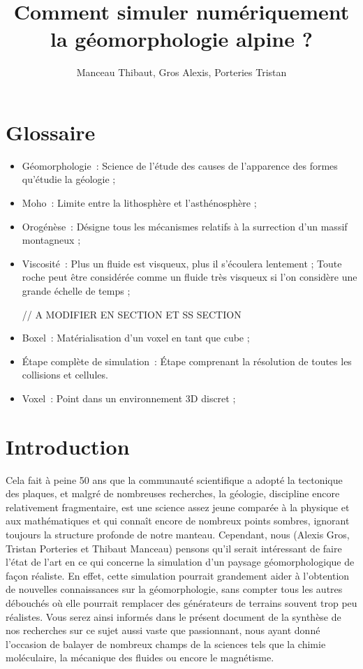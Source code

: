 \documentclass[a4paper,11pt]{article}
\title{Comment simuler numériquement la géomorphologie alpine ?}
\author{Manceau Thibaut, Gros Alexis, Porteries Tristan}
\begin{document}
\maketitle

\clearpage

\tableofcontents

\clearpage

\section{Glossaire}

\begin{itemize}

  \item Géomorphologie~: Science de l'étude des causes de l'apparence des formes qu'étudie la géologie ;
  \item Moho~: Limite entre la lithosphère et l'asthénosphère ;
  \item Orogénèse~: Désigne tous les mécanismes relatifs à la surrection d'un massif montagneux ;
  \item Viscosité~: Plus un fluide est visqueux, plus il s'écoulera lentement ;
  Toute roche peut être considérée comme un fluide très visqueux si l'on considère une grande échelle de temps ;
  
  // A MODIFIER EN SECTION ET SS SECTION
  \item Boxel~: Matérialisation d'un voxel en tant que cube ;
  \item Étape complète de simulation~: Étape comprenant la résolution de toutes les collisions et cellules.
  \item Voxel~: Point dans un environnement 3D discret ;
\end{itemize}

\section{Introduction}

Cela fait à peine 50 ans que la communauté scientifique a adopté la tectonique des plaques, et malgré de nombreuses recherches, la géologie, discipline encore relativement fragmentaire, est une science assez jeune comparée à la physique et aux mathématiques et qui connaît encore de nombreux points sombres, ignorant toujours la structure profonde de notre manteau.
Cependant, nous (Alexis Gros, Tristan Porteries et Thibaut Manceau) pensons qu'il serait intéressant de faire l'état de l'art en ce qui concerne la simulation d'un paysage géomorphologique de façon réaliste.
En effet, cette simulation pourrait grandement aider à l'obtention de nouvelles connaissances sur la géomorphologie, sans compter tous les autres débouchés où elle pourrait remplacer des générateurs de terrains souvent trop peu réalistes.
Vous serez ainsi informés dans le présent document de la synthèse de nos recherches sur ce sujet aussi vaste que passionnant, nous ayant donné l'occasion de balayer de nombreux champs de la sciences tels que la chimie moléculaire, la mécanique des fluides ou encore le magnétisme.
\end{document}
